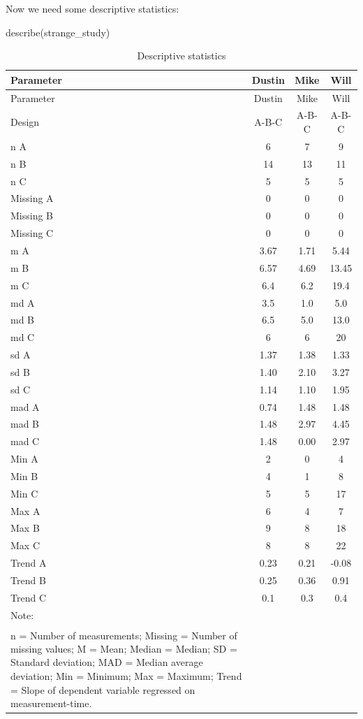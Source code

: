 \documentclass[
  letterpaper,
  DIV=11,
  numbers=noendperiod]{scrreprt}
\newenvironment{Shaded}{\begin{snugshade}}{\end{snugshade}}
\newcommand{\FunctionTok}[1]{\textcolor[rgb]{0.28,0.35,0.67}{#1}}
\newcommand{\NormalTok}[1]{\textcolor[rgb]{0.00,0.23,0.31}{#1}}
\begin{document}
Now we need some descriptive statistics:

\begin{Shaded}
\begin{Highlighting}[]
\FunctionTok{describe}\NormalTok{(strange\_study)}
\end{Highlighting}
\end{Shaded}

\begin{longtable}[]{@{}lccc@{}}
\caption{Descriptive statistics}\tabularnewline
\toprule()
Parameter & Dustin & Mike & Will \\
\midrule()
\endfirsthead
\toprule()
Parameter & Dustin & Mike & Will \\
\midrule()
\endhead
Design & A-B-C & A-B-C & A-B-C \\
n A & 6 & 7 & 9 \\
n B & 14 & 13 & 11 \\
n C & 5 & 5 & 5 \\
Missing A & 0 & 0 & 0 \\
Missing B & 0 & 0 & 0 \\
Missing C & 0 & 0 & 0 \\
m A & 3.67 & 1.71 & 5.44 \\
m B & 6.57 & 4.69 & 13.45 \\
m C & 6.4 & 6.2 & 19.4 \\
md A & 3.5 & 1.0 & 5.0 \\
md B & 6.5 & 5.0 & 13.0 \\
md C & 6 & 6 & 20 \\
sd A & 1.37 & 1.38 & 1.33 \\
sd B & 1.40 & 2.10 & 3.27 \\
sd C & 1.14 & 1.10 & 1.95 \\
mad A & 0.74 & 1.48 & 1.48 \\
mad B & 1.48 & 2.97 & 4.45 \\
mad C & 1.48 & 0.00 & 2.97 \\
Min A & 2 & 0 & 4 \\
Min B & 4 & 1 & 8 \\
Min C & 5 & 5 & 17 \\
Max A & 6 & 4 & 7 \\
Max B & 9 & 8 & 18 \\
Max C & 8 & 8 & 22 \\
Trend A & 0.23 & 0.21 & -0.08 \\
Trend B & 0.25 & 0.36 & 0.91 \\
Trend C & 0.1 & 0.3 & 0.4 \\
{Note: } & & & \\
\textsuperscript{} n = Number of measurements; Missing = Number of
missing values; M = Mean; Median = Median; SD = Standard deviation; MAD
= Median average deviation; Min = Minimum; Max = Maximum; Trend = Slope
of dependent variable regressed on measurement-time. & & & \\
\bottomrule()
\end{longtable}
\end{document}
